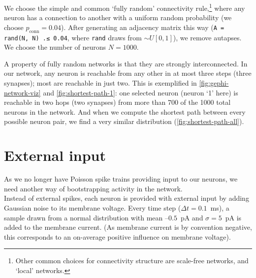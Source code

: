 

We choose the simple and common `fully random' connectivity rule,\footnote{
    Other common choices for connectivity structure are scale-free networks, and `local' networks.
}
where any neuron has a connection to another with a uniform random probability (we choose $p_\text{conn} = 0.04$). After generating an adjacency matrix this way (\verb|A = rand(N, N) .≤ 0.04|, where \verb|rand| draws from $\sim U[0,1]$), we remove autapses. We choose the number of neurons $N = 1000$.

A property of fully random networks is that they are strongly interconnected. In our network, any neuron is reachable from any other in at most three steps (three synapses); most are reachable in just two. This is exemplified in \cref{fig:gephi-network-viz} and \cref{fig:shortest-path-1}: one selected neuron (neuron `1' here) is reachable in two hops (two synapses) from more than 700 of the 1000 total neurons in the network. And when we compute the shortest path between every possible neuron pair, we find a very similar distribution (\cref{fig:shortest-path-all}).




\section{External input}

As we no longer have Poisson spike trains providing input to our neurons, we need another way of bootstrapping activity in the network.\\
Instead of external spikes, each neuron is provided with external input by adding Gaussian noise to its membrane voltage. Every time step ($Δt = 0.1$~ms), a sample drawn from a normal distribution with mean $–0.5$~pA and $σ = 5$~pA is added to the membrane current. (As membrane current is by convention negative, this corresponds to an on-average positive influence on membrane voltage).
